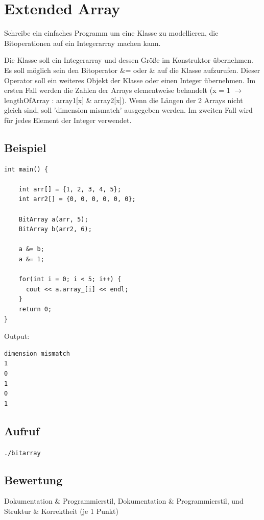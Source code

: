 \documentclass[a4paper,10pt]{article}
\begin{document}
\section*{Extended Array}

Schreibe ein einfaches Programm um eine Klasse zu modellieren, die Bitoperationen auf ein Integerarray machen kann. 

Die Klasse soll ein Integerarray und dessen Größe im Konstruktor übernehmen. Es soll möglich sein den Bitoperator \&= oder \& auf die Klasse aufzurufen. Dieser Operator soll ein weiteres Objekt der Klasse oder einen Integer übernehmen. Im ersten Fall werden die Zahlen der Arrays elementweise behandelt (x = 1 $\rightarrow$ lengthOfArray : array1[x] \& array2[x]). Wenn die Längen der 2 Arrays nicht gleich sind, soll 'dimension mismatch' ausgegeben werden. Im zweiten Fall wird für jedes Element der Integer verwendet. 

\subsection*{Beispiel}
\begin{verbatim}
int main() {

    int arr[] = {1, 2, 3, 4, 5};
    int arr2[] = {0, 0, 0, 0, 0, 0};

    BitArray a(arr, 5);
    BitArray b(arr2, 6);

    a &= b;
    a &= 1;
    
    for(int i = 0; i < 5; i++) {
      cout << a.array_[i] << endl;
    }
    return 0;
}
\end{verbatim}
Output: 
\begin{verbatim}
dimension mismatch
1
0
1
0
1
\end{verbatim}

\subsection*{Aufruf}
\texttt{./bitarray}

\subsection*{Bewertung}
Dokumentation \& Programmierstil,  Dokumentation \& Programmierstil, und Struktur \& Korrektheit (je 1 Punkt)
\newpage
\end{document}
